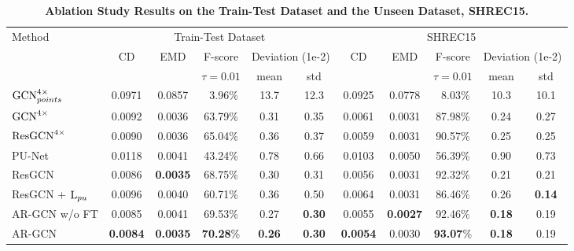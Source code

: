 \documentclass[10pt,twocolumn,letterpaper]{article}
\begin{document}
\begin{table*}[ht]
\small
\begin{center}
\begin{tabular}{l|cc|c|cc||cc|c|cc}
\hline
\multirow{3}{*}{Method} & \multicolumn{5}{c||}{Train-Test Dataset} & \multicolumn{5}{c}{SHREC15} \\
\cline{2-11}
& \multirow{2}{*}{CD} & \multirow{2}{*}{EMD} & \multicolumn{1}{|c}{F-score} & \multicolumn{2}{|c||}{Deviation (1e-2)} & \multirow{2}{*}{CD} & \multirow{2}{*}{EMD} & \multicolumn{1}{|c}{F-score} & \multicolumn{2}{|c}{Deviation (1e-2)} \\
\cline{4-6}
\cline{9-11}
& & & $\tau=0.01$ & mean & std & & & $\tau=0.01$ & mean & std \\
\hline
\hline
$\textnormal{GCN}_{points}^{4\times}$ & 0.0971 & 0.0857 & ~3.96\% & 13.7 & 12.3 & 0.0925 & 0.0778 & ~8.03\% & 10.3 & 10.1\\
$\textnormal{GCN}^{4\times}$ & 0.0092 & 0.0036 & 63.79\% & 0.31 & 0.35 & 0.0061 & 0.0031 & 87.98\% & 0.24 & 0.27 \\
$\textnormal{ResGCN}^{4\times}$ & 0.0090 & 0.0036 & 65.04\% & 0.36 & 0.37 & 0.0059 & 0.0031 & 90.57\% & 0.25 & 0.25 \\
\hline
PU-Net~\cite{yu2018pu} & 0.0118 & 0.0041 & 43.24\% & 0.78 & 0.66 & 0.0103 & 0.0050 & 56.39\% & 0.90 & 0.73\\
ResGCN & 0.0086 & \textbf{0.0035} & 68.75\% & 0.30 & 0.31 & 0.0056 & 0.0031 & 92.32\% & 0.21 & 0.21\\
ResGCN + $\textnormal{L}_{pu}$ & 0.0096 & 0.0040 & 60.71\% & 0.36 & 0.50 & 0.0064 & 0.0031 & 86.46\% & 0.26 & \textbf{0.14} \\
\hline
AR-GCN w/o FT & 0.0085 & 0.0041 & 69.53\% & 0.27 & \textbf{0.30} & 0.0055 & \textbf{0.0027} & 92.46\% & \textbf{0.18} & 0.19 \\
AR-GCN & \textbf{0.0084} & \textbf{0.0035} & \textbf{70.28}\% & \textbf{0.26} & \textbf{0.30} & \textbf{0.0054} & 0.0030 & \textbf{93.07}\% & \textbf{0.18} & 0.19 \\
\hline
\end{tabular}
\end{center}
	\vspace{-1.5em}
	\caption{\textbf{Ablation Study Results on the Train-Test Dataset and the Unseen Dataset, SHREC15.}}
	\vspace{-1em}
	\label{table:ablation_result}
\end{table*}

\vspace{-1em}
\end{document}
